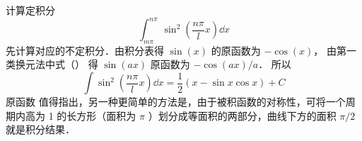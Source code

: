 \begin{exam}{计算定积分}
\begin{equation}
\int_{m\pi}^{n\pi} \sin^2(\frac{n\pi}{l} x) \dd{x}
\end{equation}
先计算对应的不定积分．由积分表得 $\sin(x)$ 的原函数为 $-\cos(x)$， 由第一类换元法中式（） %
得 $\sin(ax)$ 原函数为 $-\cos(ax)/a$． 所以
\begin{equation}
\int\sin^2(\frac{n\pi}{l} x) \dd{x} = \frac{1}{2}(x - \sin x\cos x) + C
\end{equation}
原函数
值得指出，另一种更简单的方法是，由于被积函数的对称性，可将一个周期内高为 1 的长方形（面积为 $\pi$ ）划分成等面积的两部分，曲线下方的面积 $\pi /2$ 就是积分结果．%
\end{exam}
